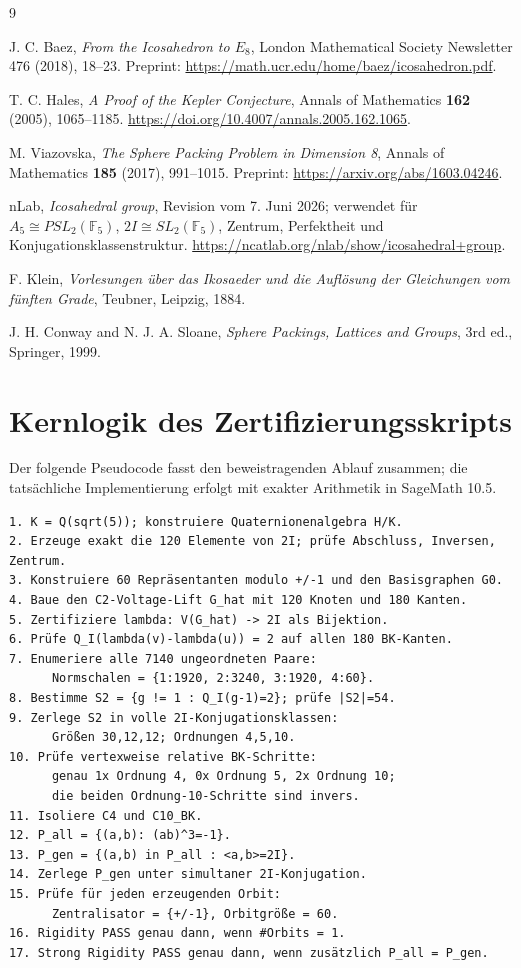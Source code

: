 \documentclass[11pt,a4paper]{article}
\theoremstyle{definition}
\begin{document}
\begin{thebibliography}{9}

J. C. Baez,
\emph{From the Icosahedron to \(E_8\)},
London Mathematical Society Newsletter 476 (2018), 18--23.
Preprint: \url{https://math.ucr.edu/home/baez/icosahedron.pdf}.

T. C. Hales,
\emph{A Proof of the Kepler Conjecture},
Annals of Mathematics \textbf{162} (2005), 1065--1185.
\url{https://doi.org/10.4007/annals.2005.162.1065}.

M. Viazovska,
\emph{The Sphere Packing Problem in Dimension 8},
Annals of Mathematics \textbf{185} (2017), 991--1015.
Preprint: \url{https://arxiv.org/abs/1603.04246}.

nLab,
\emph{Icosahedral group},
Revision vom 7. Juni 2026; verwendet für $A_5\cong PSL_2(\mathbb F_5)$, $2I\cong SL_2(\mathbb F_5)$, Zentrum, Perfektheit und Konjugationsklassenstruktur.
\url{https://ncatlab.org/nlab/show/icosahedral+group}.

F. Klein,
\emph{Vorlesungen über das Ikosaeder und die Auflösung der Gleichungen vom fünften Grade},
Teubner, Leipzig, 1884.

J. H. Conway and N. J. A. Sloane,
\emph{Sphere Packings, Lattices and Groups},
3rd ed., Springer, 1999.

\end{thebibliography}

\appendix
\section{Kernlogik des Zertifizierungsskripts}

Der folgende Pseudocode fasst den beweistragenden Ablauf zusammen; die tatsächliche Implementierung erfolgt mit exakter Arithmetik in SageMath 10.5.

\begin{verbatim}
1. K = Q(sqrt(5)); konstruiere Quaternionenalgebra H/K.
2. Erzeuge exakt die 120 Elemente von 2I; prüfe Abschluss, Inversen, Zentrum.
3. Konstruiere 60 Repräsentanten modulo +/-1 und den Basisgraphen G0.
4. Baue den C2-Voltage-Lift G_hat mit 120 Knoten und 180 Kanten.
5. Zertifiziere lambda: V(G_hat) -> 2I als Bijektion.
6. Prüfe Q_I(lambda(v)-lambda(u)) = 2 auf allen 180 BK-Kanten.
7. Enumeriere alle 7140 ungeordneten Paare:
      Normschalen = {1:1920, 2:3240, 3:1920, 4:60}.
8. Bestimme S2 = {g != 1 : Q_I(g-1)=2}; prüfe |S2|=54.
9. Zerlege S2 in volle 2I-Konjugationsklassen:
      Größen 30,12,12; Ordnungen 4,5,10.
10. Prüfe vertexweise relative BK-Schritte:
      genau 1x Ordnung 4, 0x Ordnung 5, 2x Ordnung 10;
      die beiden Ordnung-10-Schritte sind invers.
11. Isoliere C4 und C10_BK.
12. P_all = {(a,b): (ab)^3=-1}.
13. P_gen = {(a,b) in P_all : <a,b>=2I}.
14. Zerlege P_gen unter simultaner 2I-Konjugation.
15. Prüfe für jeden erzeugenden Orbit:
      Zentralisator = {+/-1}, Orbitgröße = 60.
16. Rigidity PASS genau dann, wenn #Orbits = 1.
17. Strong Rigidity PASS genau dann, wenn zusätzlich P_all = P_gen.
\end{verbatim}
\end{document}
